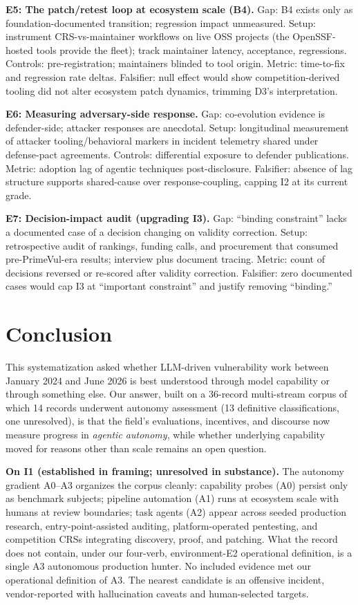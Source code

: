 \documentclass[conference,compsoc]{IEEEtran}
\begin{document}
\textbf{E5: The patch/retest loop at ecosystem scale (B4).}
Gap: B4 exists only as foundation-documented transition; regression impact unmeasured.
Setup: instrument CRS-vs-maintainer workflows on live OSS projects (the OpenSSF-hosted tools
provide the fleet); track maintainer latency, acceptance, regressions. Controls:
pre-registration; maintainers blinded to tool origin. Metric: time-to-fix and regression rate
deltas. Falsifier: null effect would show competition-derived tooling did not alter ecosystem
patch dynamics, trimming D3's interpretation.

\textbf{E6: Measuring adversary-side response.}
Gap: co-evolution evidence is defender-side; attacker responses are anecdotal. Setup:
longitudinal measurement of attacker tooling/behavioral markers in incident telemetry
shared under defense-pact agreements. Controls: differential exposure to defender
publications. Metric: adoption lag of agentic techniques post-disclosure. Falsifier: absence
of lag structure supports shared-cause over response-coupling, capping I2 at its current grade.

\textbf{E7: Decision-impact audit (upgrading I3).}
Gap: ``binding constraint'' lacks a documented case of a decision changing on
validity correction. Setup: retrospective audit of rankings, funding calls, and procurement
that consumed pre-PrimeVul-era results; interview plus document tracing. Metric: count of
decisions reversed or re-scored after validity correction. Falsifier: zero documented cases
would cap I3 at ``important constraint'' and justify removing ``binding.''

\vspace{6pt}
\section{Conclusion}
\label{sec:conclusion}
This systematization asked whether LLM-driven vulnerability work between January 2024 and June
2026 is best understood through model capability or through something else. Our answer, built
on a 36-record multi-stream corpus of which 14 records underwent autonomy assessment (13
definitive classifications, one unresolved), is that
the field's evaluations, incentives, and discourse now measure progress in \emph{agentic
autonomy}, while whether underlying capability moved for reasons other than scale remains
an open question.

\textbf{On I1 (established in framing; unresolved in substance).} The autonomy gradient A0--A3
organizes the corpus cleanly: capability probes (A0) persist only as benchmark subjects;
pipeline automation (A1) runs at ecosystem scale with humans at review boundaries; task agents
(A2) appear across seeded production research, entry-point-assisted auditing, platform-operated
pentesting, and competition CRSs integrating discovery, proof, and patching. What the record
does not contain, under our four-verb, environment-E2 operational definition, is a single
A3 autonomous production hunter. No included evidence met our operational definition of A3. The nearest candidate is an offensive incident,
vendor-reported with hallucination caveats and human-selected targets.
\end{document}
